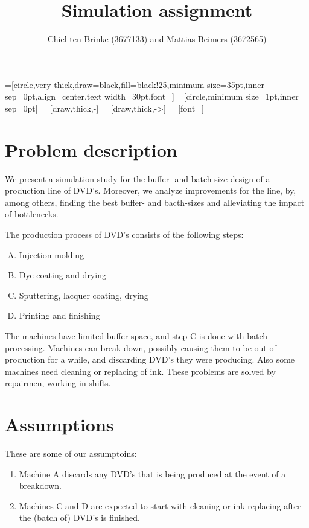 \documentclass{article}
\title{Simulation assignment}
\author{Chiel ten Brinke (3677133) and Mattias Beimers (3672565)}
\date{\vspace{-3ex}}
\begin{document}
    =[circle,very thick,draw=black,fill=black!25,minimum size=35pt,inner sep=0pt,align=center,text width=30pt,font=\scriptsize]
    =[circle,minimum size=1pt,inner sep=0pt]
     = [draw,thick,-]
     = [draw,thick,->]
     = [font=\scriptsize]

    \maketitle


    \section{Problem description}
        We present a simulation study for the buffer- and batch-size design of a production line of DVD's.
        Moreover, we analyze improvements for the line, by, among others, finding the best buffer- and bacth-sizes and alleviating the impact of bottlenecks.

        The production process of DVD's consists of the following steps:
        \begin{enumerate}[A.]
            \item Injection molding
            \item Dye coating and drying
            \item Sputtering, lacquer coating, drying
            \item Printing and finishing 
        \end{enumerate}
        The machines have limited buffer space, and step C is done with batch processing.
        Machines can break down, possibly causing them to be out of production for a while,
        and discarding DVD's they were producing. Also some machines need cleaning or replacing of ink.
        These problems are solved by repairmen, working in shifts.

    \section{Assumptions}
        These are some of our assumptoins:
        \begin{enumerate}
            \item 
                Machine A discards any DVD's that is being produced at the event of a breakdown.
            \item 
                Machines C and D are expected to start with cleaning or ink replacing after the (batch of) DVD's is finished.
        \end{enumerate}
\end{document}
